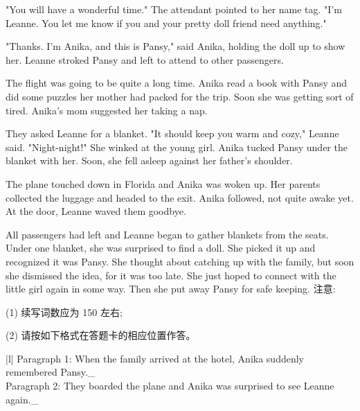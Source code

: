 \documentclass{英语试卷}
\begin{document}
\par "You will have a wonderful time." The attendant pointed to her name tag. "I'm Leanne. You let me know if you and your pretty doll friend need anything."\par
\par "Thanks. I'm Anika, and this is Pansy," said Anika, holding the doll up to show her. Leanne stroked Pansy and left to attend to other passengers.\par
\par The flight was going to be quite a long time. Anika read a book with Pansy and did some puzzles her mother had packed for the trip. Soon she was getting sort of tired. Anika's mom suggested her taking a nap.\par
\par They asked Leanne for a blanket. "It should keep you warm and cozy," Leanne said. "Night-night!" She winked at the young girl. Anika tucked Pansy under the blanket with her. Soon, she fell asleep against her father's shoulder.\par
\par The plane touched down in Florida and Anika was woken up. Her parents collected the luggage and headed to the exit. Anika followed, not quite awake yet. At the door, Leanne waved them goodbye.\par
\par All passengers had left and Leanne began to gather blankets from the seats. Under one blanket, she was surprised to find a doll. She picked it up and recognized it was Pansy. She thought about catching up with the family, but soon she dismissed the idea, for it was too late. She just hoped to connect with the little girl again in some way. Then she put away Pansy for safe keeping. 注意:\par
\par (1) 续写词数应为 150 左右;\par
\par (2) 请按如下格式在答题卡的相应位置作答。\par
\par\vspace{0.4em}
\begin{center}\begin{tabular}{{|l|}}
\hline
Paragraph 1: When the family arrived at the hotel, Anika suddenly remembered Pansy.\_ \\
Paragraph 2: They boarded the plane and Anika was surprised to see Leanne again.\_ \\
\hline
\end{tabular}\end{center}
\vspace{0.4em}
\end{document}
